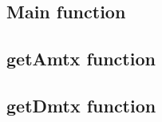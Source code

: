 \subsection*{Main function}
{\footnotesize }
\newpage
\subsection*{getAmtx function}
{\footnotesize }
\newpage
\subsection*{getDmtx function}
{\footnotesize }